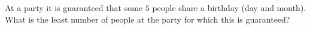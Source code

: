 At a party it is guaranteed that some $5$ people share a birthday (day and month). What is the least number of people at the party for which this is guaranteed?
